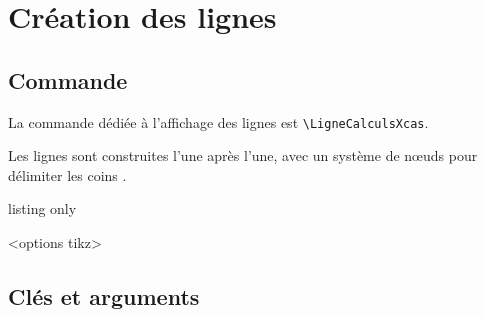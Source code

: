 \documentclass[french,a4paper,11pt]{article}
\begin{document}
\pagebreak

\section{Création des lignes}

\subsection{Commande}

\begin{cautionblock}
La commande dédiée à l'affichage des lignes est \texttt{\textbackslash LigneCalculsXcas}.

Les lignes sont construites l'une après l'une, avec un système de nœuds pour délimiter les \og coins \fg.
\end{cautionblock}

\begin{PresentationCode}{listing only}
\begin{CalculFormelXcas}<options tikz>
\end{CalculFormelXcas}
\end{PresentationCode}

\begin{PresentationCode}{}
\begin{CalculFormelXcas}
\end{CalculFormelXcas}
\end{PresentationCode}

\subsection{Clés et arguments}
\end{document}
